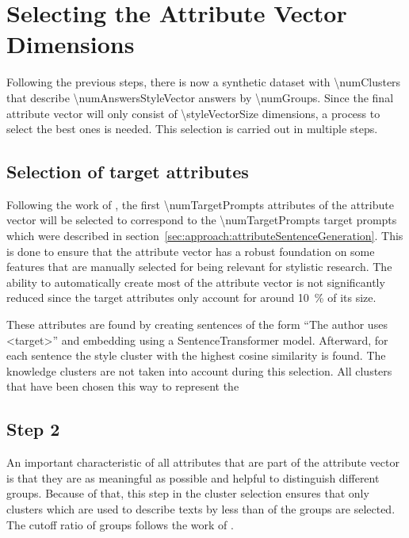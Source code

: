 \section{Selecting the Attribute Vector Dimensions}
\label{sec:approach:selection}

Following the previous steps, there is now a synthetic dataset with \num{\numClusters} that describe \num{\numAnswersStyleVector} answers by \num{\numGroups}. Since the final attribute vector will only consist of \num{\styleVectorSize} dimensions, a process to select the best ones is needed. This selection is carried out in multiple steps.

\subsection{Selection of target attributes}
\label{sec:approach:selection:targetAttributes}
Following the work of \citet{patelLearningInterpretableStyle2023}, the first \num{\numTargetPrompts} attributes of the attribute vector will be selected to correspond to the \num{\numTargetPrompts} target prompts which were described in section~\ref{sec:approach:attributeSentenceGeneration}.
This is done to ensure that the attribute vector has a robust foundation on some features that are manually selected for being relevant for stylistic research. The ability to automatically create most of the attribute vector is not significantly reduced since the target attributes only account for around \SI{10}{\percent} of its size.

These attributes are found by creating sentences of the form \enquote{The author uses <target>} and embedding using a SentenceTransformer model. %
Afterward, for each sentence the style cluster with the highest cosine similarity is found. The knowledge clusters are not taken into account during this selection.
All clusters that have been chosen this way to represent the


\subsection{Step 2}
An important characteristic of all attributes that are part of the attribute vector is that they are as meaningful as possible and helpful to distinguish different groups. Because of that, this step in the cluster selection ensures that only clusters which are used to describe texts by less than \clusterMaxGroupRatio{} of the groups are selected. The cutoff ratio of groups follows the work of \citet{patelLearningInterpretableStyle2023}.

